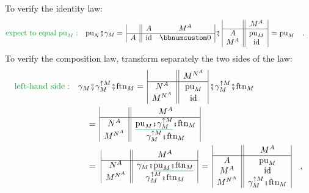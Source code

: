 To verify the identity law:
\begin{align*}
{\color{greenunder}\text{expect to equal }\text{pu}_{M}:}\quad & \text{pu}_{N}\bef\gamma_{M}=\,\begin{array}{|c||cc|}
 & A & M^{A}\\
\hline A & \text{id} & \bbnum 0
\end{array}\,\bef\,\begin{array}{|c||c|}
 & M^{A}\\
\hline A & \text{pu}_{M}\\
M^{A} & \text{id}
\end{array}\,=\text{pu}_{M}\quad.
\end{align*}
To verify the composition law, transform separately the two sides
of the law:
\begin{align*}
{\color{greenunder}\text{left-hand side}:}\quad & \gamma_{M}\bef\gamma_{M}^{\uparrow M}\bef\text{ftn}_{M}=\,\begin{array}{|c||c|}
 & M^{N^{A}}\\
\hline N^{A} & \text{pu}_{M}\\
M^{N^{A}} & \text{id}
\end{array}\,\bef\gamma_{M}^{\uparrow M}\bef\text{ftn}_{M}\\
 & \quad=\,\begin{array}{|c||c|}
 & M^{A}\\
\hline N^{A} & \gunderline{\text{pu}_{M}\bef\gamma_{M}^{\uparrow M}}\bef\text{ftn}_{M}\\
M^{N^{A}} & \gamma_{M}^{\uparrow M}\bef\text{ftn}_{M}
\end{array}\\
 & \quad=\,\,\begin{array}{|c||c|}
 & M^{A}\\
\hline N^{A} & \gamma_{M}\bef\gunderline{\text{pu}_{M}\bef\text{ftn}_{M}}\\
M^{N^{A}} & \gamma_{M}^{\uparrow M}\bef\text{ftn}_{M}
\end{array}\,=\,\begin{array}{|c||c|}
 & M^{A}\\
\hline A & \text{pu}_{M}\\
M^{A} & \text{id}\\
M^{N^{A}} & \gamma_{M}^{\uparrow M}\bef\text{ftn}_{M}
\end{array}\quad,
\end{align*}
